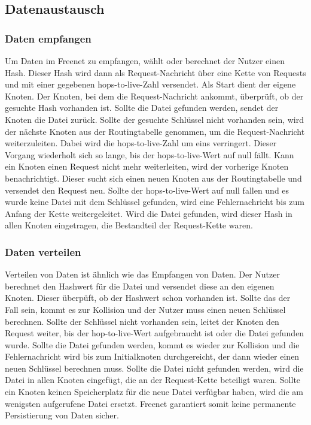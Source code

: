 \subsection{Datenaustausch}
\subsubsection{Daten empfangen}
Um Daten im Freenet zu empfangen, wählt oder berechnet der Nutzer einen Hash.
Dieser Hash wird dann als Request-Nachricht über eine Kette von Requests und
mit einer gegebenen hops-to-live-Zahl versendet. Als Start dient der eigene Knoten.
Der Knoten, bei dem die Request-Nachricht ankommt, überprüft, ob der gesuchte
Hash vorhanden ist. Sollte die Datei gefunden werden, sendet der Knoten
die Datei zurück. Sollte der gesuchte Schlüssel nicht vorhanden sein, wird
der nächste Knoten aus der Routingtabelle genommen, um die Request-Nachricht
weiterzuleiten. Dabei wird die hops-to-live-Zahl um eins verringert. Dieser
Vorgang wiederholt sich so lange, bis der hops-to-live-Wert auf null fällt.
Kann ein Knoten einen Request nicht mehr weiterleiten, wird der vorherige
Knoten benachrichtigt. Dieser sucht sich einen neuen Knoten aus der
Routingtabelle und versendet den Request neu. Sollte der hops-to-live-Wert auf
null fallen und es wurde keine Datei mit dem Schlüssel gefunden, wird eine
Fehlernachricht bis zum Anfang der Kette weitergeleitet.
Wird die Datei gefunden, wird dieser Hash in allen Knoten eingetragen, die
Bestandteil der Request-Kette waren.

\subsubsection{Daten verteilen}
Verteilen von Daten ist ähnlich wie das Empfangen von Daten. Der Nutzer
berechnet den Hashwert für die Datei und versendet diese an den eigenen Knoten.
Dieser überpüft, ob der Hashwert schon vorhanden ist. Sollte das der Fall sein,
kommt es zur Kollision und der Nutzer muss einen neuen Schlüssel berechnen.
Sollte der Schlüssel nicht vorhanden sein, leitet der Knoten den Request
weiter, bis der hop-to-live-Wert aufgebraucht ist oder die Datei gefunden
wurde. Sollte die Datei gefunden werden, kommt es wieder zur Kollision und die
Fehlernachricht wird bis zum Initialknoten durchgereicht, der dann wieder einen
neuen Schlüssel berechnen muss. Sollte die Datei nicht gefunden werden, wird
die Datei in allen Knoten eingefügt, die an der Request-Kette beteiligt waren.
Sollte ein Knoten keinen Speicherplatz für die neue Datei verfügbar haben,
wird die am wenigsten aufgerufene Datei ersetzt. Freenet garantiert somit keine
permanente Persistierung von Daten sicher.

